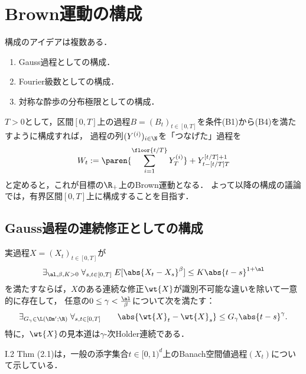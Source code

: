 \documentclass[uplatex,dvipdfmx]{jsreport}
\begin{document}
\section{Brown運動の構成}

\begin{tcolorbox}[colframe=ForestGreen, colback=ForestGreen!10!white,breakable,colbacktitle=ForestGreen!40!white,coltitle=black,fonttitle=\bfseries\sffamily,
    title=]
    構成のアイデアは複数ある．
    \begin{enumerate}
        \item Gauss過程としての構成．
        \item Fourier級数としての構成．
        \item 対称な酔歩の分布極限としての構成．
    \end{enumerate}
\end{tcolorbox}

\begin{shishin}
    $T>0$として，区間$[0,T]$上の過程$B=(B_t)_{t\in[0,T]}$を条件(B1)から(B4)を満たすように構成すれば，
    過程の列$(Y^{(i)})_{i\in\N}$を「つなげた」過程を
    \[W_t:=\paren{\sum^{\floor{t/T}}_{i=1}Y_T^{(i)}}+Y^{[t/T]+1}_{t-[t/T]T}\]
    と定めると，これが目標の$\R_+$上のBrown運動となる．
    よって以降の構成の議論では，有界区間$[0,T]$上に構成することを目指す．
\end{shishin}

\subsection{Gauss過程の連続修正としての構成}

\begin{theorem}\label{thm-Kolmogorov-continuity-criterion}
    実過程$X=(X_t)_{t\in[0,T]}$が
    \[\exists_{\al,\beta,K>0}\;\forall_{s,t\in[0,T]}\;E[\abs{X_{t}-X_s}^\beta]\le K\abs{t-s}^{1+\al}\]
    を満たすならば，$X$のある連続な修正$\wt{X}$が識別不可能な違いを除いて一意的に存在して，
    任意の$0\le\gamma<\frac{\al}{\beta}$について次を満たす：
    \[\exists_{G_\gamma\in\L(\Om';\R)}\;\forall_{s,t\in[0,T]}\qquad\abs{\wt{X}_t-\wt{X}_s}\le G_\gamma\abs{t-s}^\gamma.\]
    特に，$\wt{X}$の見本道は$\gamma$-次Holder連続である．
\end{theorem}
\begin{Proof}
    \cite{Revuz-Yor}I.2 Thm (2.1)は，一般の添字集合$t\in[0,1)^d$上のBanach空間値過程$(X_t)$について示している．
\end{Proof}
\end{document}

